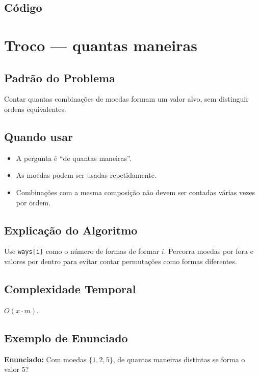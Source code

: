 \subsection{Código}

\section{Troco --- quantas maneiras}

\subsection{Padrão do Problema}
Contar quantas combinações de moedas formam um valor alvo, sem distinguir ordens equivalentes.

\subsection{Quando usar}
\begin{itemize}[nosep]
  \item A pergunta é ``de quantas maneiras''.
  \item As moedas podem ser usadas repetidamente.
  \item Combinações com a mesma composição não devem ser contadas várias vezes por ordem.
\end{itemize}

\subsection{Explicação do Algoritmo}
Use \texttt{ways[i]} como o número de formas de formar $i$. Percorra moedas por fora e valores por dentro para evitar contar permutações como formas diferentes.

\subsection{Complexidade Temporal}
$O(x \cdot m)$.

\subsection{Exemplo de Enunciado}
\begin{exemplodiabox}
\textbf{Enunciado:} Com moedas $\{1, 2, 5\}$, de quantas maneiras distintas se forma o valor $5$?
\end{exemplodiabox}

